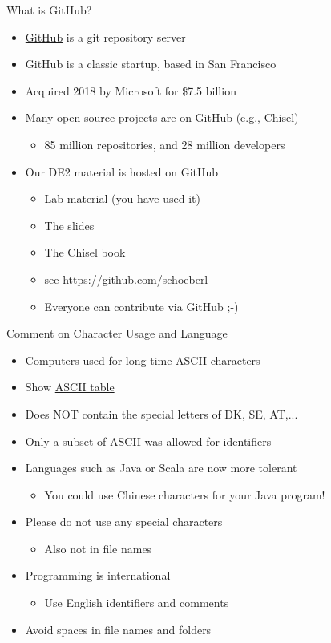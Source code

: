 \begin{frame}[fragile]{What is GitHub?}
\begin{itemize}
\item \href{https://github.com/}{GitHub} is a git repository server
\item GitHub is a classic startup, based in San Francisco
\item Acquired 2018 by Microsoft for \$7.5 billion
\item Many open-source projects are on GitHub (e.g., Chisel)
\begin{itemize}
\item 85 million repositories, and 28 million developers
\end{itemize}
\item Our DE2 material is hosted on GitHub
\begin{itemize}
\item Lab material (you have used it)
\item The slides
\item The Chisel book
\item see \url{https://github.com/schoeberl}
\item Everyone can contribute via GitHub ;-)
\end{itemize}
\end{itemize}
\end{frame}


\begin{frame}[fragile]{Comment on Character Usage and Language}
\begin{itemize}
\item Computers used for long time ASCII characters
\item Show \href{http://www.asciitable.com/}{ASCII table}
\item Does NOT contain the special letters of DK, SE, AT,...
\item Only a subset of ASCII was allowed for identifiers
\item Languages such as Java or Scala are now more tolerant
\begin{itemize}
\item You could use Chinese characters for your Java program!
\end{itemize}
\item Please do not use any special characters
\begin{itemize}
\item Also not in file names
\end{itemize}
\item Programming is international
\begin{itemize}
\item Use English identifiers and comments
\end{itemize}
\item Avoid spaces in file names and folders
\end{itemize}
\end{frame}

